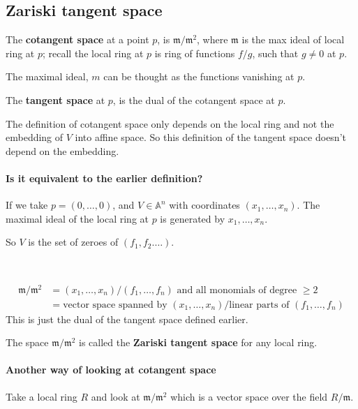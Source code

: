 \subsection{Zariski tangent space}
\begin{definition}
    The \textbf{cotangent space} at a point $p$, is $\mathfrak{m}/\mathfrak{m}^2$, where $\mathfrak{m}$ is the max ideal of local ring at $p$; recall the local ring at $p$ is ring of functions $f/g$, such that $g\neq 0$ at $p$.

    The maximal ideal, $m$ can be thought as the functions vanishing at $p$.
\end{definition}

\begin{definition}
    The \textbf{tangent space} at $p$, is the dual of the cotangent space at $p$.
\end{definition}

The definition of cotangent space only depends on the local ring and not the embedding of $V$ into affine space. So this definition of the tangent space doesn't depend on the embedding.

\paragraph*{Is it equivalent to the earlier definition?}
If we take $p = (0,\ldots, 0)$, and $V\in \mathbb{A}^n$ with coordinates $(x_1,\ldots,x_n)$. The maximal ideal of the local ring at $p$ is generated by $x_1,\ldots,x_n$.

So $V$ is the set of zeroes of $(f_1,f_2.\ldots)$.

\

\begin{align*}
    \mathfrak{m}/\mathfrak{m}^2 &= (x_1,\ldots,x_n)/(f_1,\ldots,f_n)\text{ and all monomials of degree }\geq 2\\
    &= \text{vector space spanned by }(x_1,\ldots,x_n)/\text{linear parts of }(f_1,\ldots,f_n)
\end{align*}
This is just the dual of the tangent space defined earlier.
\begin{definition}
    The space $\mathfrak{m}/\mathfrak{m}^2$ is called the \textbf{Zariski tangent space} for any local ring.    
\end{definition}

\paragraph*{Another way of looking at cotangent space}
Take a local ring $R$ and look at $\mathfrak{m}/\mathfrak{m}^2$ which is a vector space over the field $R/\mathfrak{m}$.

